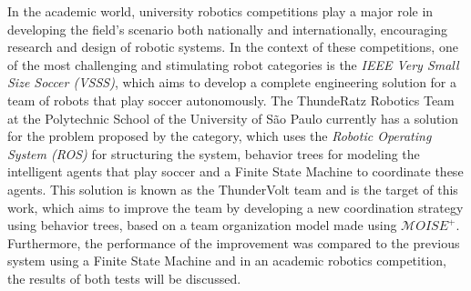 \def \MOISEp {$\mathcal{M}OISE^+$} 

In the academic world, university robotics competitions play a major role in developing the field's scenario both nationally and internationally, encouraging research and design of robotic systems. In the context of these competitions, one of the most challenging and stimulating robot categories is the \textit{IEEE Very Small Size Soccer (VSSS)}, which aims to develop a complete engineering solution for a team of robots that play soccer autonomously. The ThundeRatz Robotics Team at the Polytechnic School of the University of São Paulo currently has a solution for the problem proposed by the category, which uses the \textit{Robotic Operating System (ROS)} for structuring the system, behavior trees for modeling the intelligent agents that play soccer and a Finite State Machine to coordinate these agents. This solution is known as the ThunderVolt team and is the target of this work, which aims to improve the team by developing a new coordination strategy using behavior trees, based on a team organization model made using \MOISEp. Furthermore, the performance of the improvement was compared to the previous system using a Finite State Machine and in an academic robotics competition, the results of both tests will be discussed.
